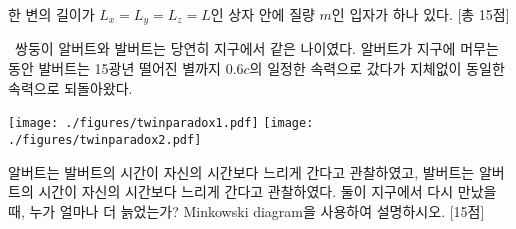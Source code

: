 \documentclass[]{gshs_exam} %
\begin{document}
\begin{multicols*}{2}
\begin{questions}
\vspace*{\fill}
\columnbreak

\question 한 변의 길이가 $L_x =L_y =L_z =L$인 상자 안에 질량 $m$인 입자가 하나 있다. [총 15점]


\vspace*{\fill}
\columnbreak

\question\nsh\ 쌍둥이 알버트와 발버트는 당연히 지구에서 같은 나이였다. 알버트가 지구에 머무는 동안 발버트는 15광년 떨어진 별까지 $0.6c$의 일정한 속력으로 갔다가 지체없이 동일한 속력으로 되돌아왔다.
\begin{center}
\texttt{[image: ./figures/twinparadox1.pdf]}
\hspace{2em}
\texttt{[image: ./figures/twinparadox2.pdf]}
\end{center}
알버트는 발버트의 시간이 자신의 시간보다 느리게 간다고 관찰하였고, 발버트는 알버트의 시간이 자신의 시간보다 느리게 간다고 관찰하였다. 둘이 지구에서 다시 만났을 때, 누가 얼마나 더 늙었는가? Minkowski diagram을 사용하여 설명하시오. [15점]




\end{questions}
\end{multicols*}
\end{document}
